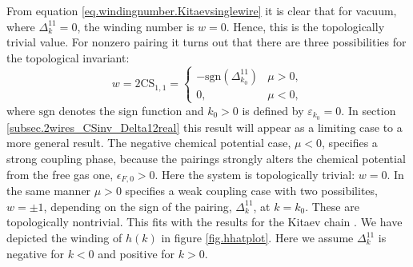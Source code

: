 From equation \eqref{eq.windingnumber.Kitaevsinglewire} it is clear that for vacuum, where $\Delta^{11}_k = 0$, the winding number is $w = 0$. Hence, this is the topologically trivial value. For nonzero pairing it turns out that there are three possibilities for the topological invariant: 
\begin{equation}
w = 2\text{CS}_{1,1} = \left\{ \begin{matrix} 
-\text{sgn}(\Delta^{11}_{k_0}) & \mu > 0, \\
0, & \mu < 0,
\end{matrix} \right. \nonumber 
\end{equation}
where $\text{sgn}$ denotes the sign function and $k_0 > 0$ is defined by $\varepsilon_{k_0} = 0$. In section \ref{subsec.2wires_CSinv_Delta12real} this result will appear as a limiting case to a more general result. The negative chemical potential case, $\mu < 0$, specifies a strong coupling phase, because the pairings strongly alters the chemical potential from the free gas one, $\epsilon_{F,0} > 0$. Here the system is topologically trivial: $w = 0$. In the same manner $\mu > 0$ specifies a weak coupling case with two possibilites, $w = \pm 1$, depending on the sign of the pairing, $\Delta^{11}_k$, at $k = k_0$. These are topologically nontrivial. This fits with the results for the Kitaev chain \cite{Alicea}. We have depicted the winding of $\hat{h}(k)$ in figure \ref{fig.hhatplot}. Here we assume $\Delta^{11}_k$ is negative for $k < 0$ and positive for $k > 0$. 

